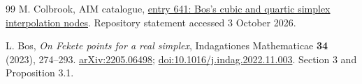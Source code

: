 \documentclass[11pt,a4paper]{article}
\theoremstyle{remark}
\begin{document}
\begin{thebibliography}{99}
M. Colbrook, AIM catalogue, \href{https://github.com/MColbrook/AIM/blob/main/problems/641-bos-simplex-interpolation-nodes.md}{entry 641: Bos's cubic and quartic simplex interpolation nodes}. Repository statement accessed 3 October 2026.

L. Bos, \emph{On Fekete points for a real simplex}, Indagationes Mathematicae \textbf{34} (2023), 274--293. \href{https://arxiv.org/abs/2205.06498}{arXiv:2205.06498}; \href{https://doi.org/10.1016/j.indag.2022.11.003}{doi:10.1016/j.indag.2022.11.003}. Section 3 and Proposition 3.1.
\end{thebibliography}
\end{document}
